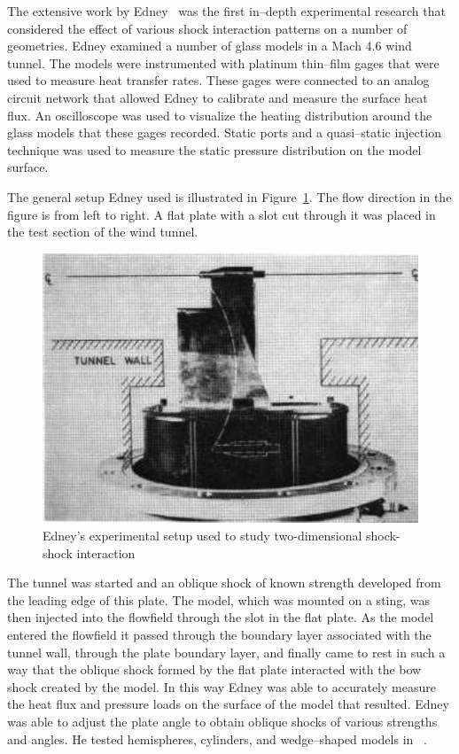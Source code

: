 The extensive work by Edney~\cite{edney-ssi} was the first in--depth experimental research that considered the effect of various shock interaction patterns on a number of geometries. Edney examined a number of glass models in a Mach 4.6 wind tunnel.  The models were instrumented with platinum thin--film gages that were used to measure heat transfer rates.  These gages were connected to an analog circuit network that allowed Edney to calibrate and measure the surface heat flux.  An oscilloscope was used to visualize the heating distribution around the glass models that these gages recorded.  Static ports and a quasi--static injection technique was used to measure the static pressure distribution on the model surface.

The general setup Edney used is illustrated in Figure~\ref{fig:edney_exp}.  The flow direction in the figure is from left to right. A flat plate with a slot cut through it was placed in the test section of the wind tunnel.
\begin{figure}[hbt]
  \begin{center}
    \includegraphics[width=.85\textwidth]{figures/edney/edney_exp}
    \caption[Edney's experimental setup used to study two-dimensional shock-shock interaction]{Edney's experimental setup used to study two-dimensional shock-shock interaction~\cite{edney-ssi}}
    \label{fig:edney_exp}
  \end{center}
\end{figure}
The tunnel was started and an oblique shock of known strength developed from the leading edge of this plate.  The model, which was mounted on a sting, was then injected into the flowfield through the slot in the flat plate.  As the model entered the flowfield it passed through the boundary layer associated with the tunnel wall, through the plate boundary layer, and finally came to rest in such a way that the oblique shock formed by the flat plate interacted with the bow shock created by the model.  In this way Edney was able to accurately measure the heat flux and pressure loads on the surface of the model that resulted.  Edney was able to adjust the plate angle to obtain oblique shocks of various strengths and angles. He tested hemispheres, cylinders, and wedge--shaped models in ~\cite{edney-ssi}.

